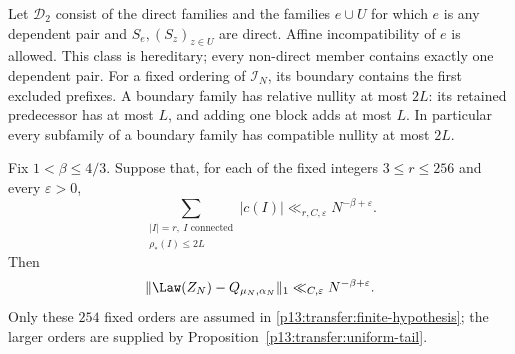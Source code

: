 Let $\mathscr D_2$ consist of the direct families and the families
$e\cup U$ for which $e$ is any dependent pair and $S_e,(S_z)_{z\in U}$
are direct. Affine incompatibility of $e$ is allowed. This class is
hereditary; every non-direct member contains exactly one dependent pair.
For a fixed ordering of $\mathcal I_N$, its boundary contains the first
excluded prefixes. A boundary family has relative nullity at most $2L$:
its retained predecessor has at most $L$, and adding one block adds
at most $L$. In particular every subfamily of a boundary family has
compatible nullity at most $2L$.

\begin{theorem}
\label{p13:transfer:finite}
Fix $1<\beta\leq4/3$. Suppose that, for each of the fixed integers
$3\leq r\leq256$ and every $\varepsilon>0$,
\begin{equation}
 \sum_{\substack{|I|=r,\ I\text{ connected}\\\rho_*(I)\leq2L}}
                   |c(I)|\ll_{r,C,\varepsilon}N^{-\beta+\varepsilon}.
 \label{p13:transfer:finite-hypothesis}
\end{equation}
Then
\begin{equation}
 \|\Law(Z_N)-Q_{\mu_N,\alpha_N}\|_1
                  \ll_{C,\varepsilon}N^{-\beta+\varepsilon}.
 \label{p13:transfer:finite-conclusion}
\end{equation}
Only these $254$ fixed orders are assumed in
\eqref{p13:transfer:finite-hypothesis}; the larger orders are supplied
by Proposition~\ref{p13:transfer:uniform-tail}.
\end{theorem}


